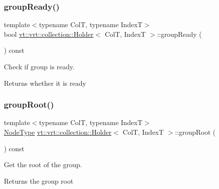 \subsubsection{\texorpdfstring{group\+Ready()}{groupReady()}}
{\footnotesize\ttfamily template$<$typename ColT, typename IndexT$>$ \\
bool \hyperlink{structvt_1_1vrt_1_1collection_1_1_holder}{vt\+::vrt\+::collection\+::\+Holder}$<$ ColT, IndexT $>$\+::group\+Ready (\begin{DoxyParamCaption}{ }\end{DoxyParamCaption}) const\hspace{0.3cm}{\ttfamily [inline]}}



Check if group is ready. 

\begin{DoxyReturn}{Returns}
whether it is ready 
\end{DoxyReturn}
\mbox{\label{structvt_1_1vrt_1_1collection_1_1_holder_a4712da9a79782e5c33de2773d66cc587}} 
\subsubsection{\texorpdfstring{group\+Root()}{groupRoot()}}
{\footnotesize\ttfamily template$<$typename ColT, typename IndexT$>$ \\
\hyperlink{namespacevt_a866da9d0efc19c0a1ce79e9e492f47e2}{Node\+Type} \hyperlink{structvt_1_1vrt_1_1collection_1_1_holder}{vt\+::vrt\+::collection\+::\+Holder}$<$ ColT, IndexT $>$\+::group\+Root (\begin{DoxyParamCaption}{ }\end{DoxyParamCaption}) const\hspace{0.3cm}{\ttfamily [inline]}}



Get the root of the group. 

\begin{DoxyReturn}{Returns}
the group root 
\end{DoxyReturn}
\mbox{\label{structvt_1_1vrt_1_1collection_1_1_holder_a67967ed879eafbbb2e8bb1230bc38874}} 
